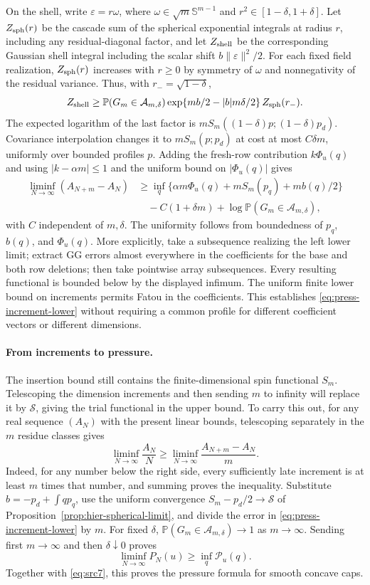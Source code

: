 \documentclass[11pt,a4paper]{article}
\numberwithin{equation}{section}
\theoremstyle{definition}
\theoremstyle{remark}
\newcommand{\Prob}{\mathbb P}
\newcommand{\eps}{\varepsilon}
\begin{document}
On the shell, write $\eps=r\omega$, where
$\omega\in\sqrt m\mathbb S^{m-1}$ and $r^2\in[1-\delta,1+\delta]$.
Let $Z_{\rm sph}(r)$ be the cascade sum of the spherical exponential
integrals at radius $r$, including any residual-diagonal factor, and let
$Z_{\rm shell}$ be the corresponding Gaussian shell integral including
the scalar shift $b\|\eps\|^2/2$. For each fixed field realization,
$Z_{\rm sph}(r)$ increases with $r\ge0$ by symmetry of $\omega$ and
nonnegativity of the residual variance. Thus, with $r_- =\sqrt{1-\delta}$,
\[
 Z_{\rm shell}\ge
 \Prob(G_m\in\mathcal A_{m,\delta})
 \exp\{mb/2-|b|m\delta/2\}\,Z_{\rm sph}(r_-).
\]
The expected logarithm of the last factor is
$mS_m((1-\delta)p;(1-\delta)p_d)$. Covariance interpolation changes it
to $mS_m(p;p_d)$ at cost at most $C\delta m$, uniformly over bounded
profiles $p$. Adding the fresh-row contribution $k\Phi_u(q)$ and using
$|k-\alpha m|\le1$ and the uniform bound on $|\Phi_u(q)|$ gives
\begin{equation}\label{eq:press-increment-lower}
 \begin{split}
 \liminf_{N\to\infty}(A_{N+m}-A_N)
 &\ge \inf_q\{\alpha m\Phi_u(q)+mS_m(p_q)+mb(q)/2\}\\
 &\quad -C(1+\delta m)+\log\Prob(G_m\in\mathcal A_{m,\delta}),
 \end{split}
\end{equation}
with $C$ independent of $m,\delta$. The uniformity follows from
boundedness of $p_q$, $b(q)$, and $\Phi_u(q)$.
More explicitly, take a subsequence realizing the left lower limit; extract
GG errors almost everywhere in the coefficients for the base and both row
deletions; then take pointwise array subsequences. Every resulting functional
is bounded below by the displayed infimum. The uniform finite lower bound
on increments permits Fatou in the coefficients. This establishes
\eqref{eq:press-increment-lower} without requiring a common profile for
different coefficient vectors or different dimensions.

\paragraph{From increments to pressure.}
The insertion bound still contains the finite-dimensional spin functional
$S_m$. Telescoping the dimension increments and then sending $m$ to infinity
will replace it by $\mathcal S$, giving the trial functional in the upper
bound. To carry this out,
for any real sequence $(A_N)$ with the present linear bounds, telescoping
separately in the $m$ residue classes gives
\[
 \liminf_{N\to\infty}\frac{A_N}{N}
 \ge\liminf_{N\to\infty}\frac{A_{N+m}-A_N}{m}.
\]
Indeed, for any number below the right side, every sufficiently late increment
is at least $m$ times that number, and summing proves the inequality.
Substitute $b=-p_d+\int qp_q$, use the uniform convergence
$S_m-p_d/2\to\mathcal S$ of Proposition~\ref{prop:hier-spherical-limit}, and
divide the error in \eqref{eq:press-increment-lower} by $m$.
For fixed $\delta$,
$\Prob(G_m\in\mathcal A_{m,\delta})\to1$ as $m\to\infty$. Sending first
$m\to\infty$ and then $\delta\downarrow0$ proves
\[
 \liminf_{N\to\infty}P_N(u)\ge\inf_q\mathcal P_u(q).
\]
Together with \eqref{eq:src7}, this proves the pressure formula for smooth
concave caps.
\end{document}

